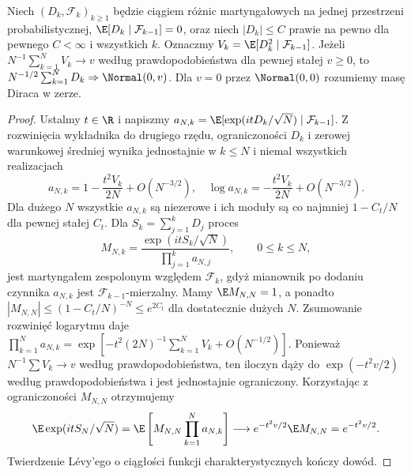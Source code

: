 \begin{lemat}
\label{lem:bounded-martingale-clt}
Niech $(D_k,\mathcal F_k)_{k\ge1}$ będzie ciągiem różnic
martyngałowych na jednej przestrzeni probabilistycznej,
$\E[D_k\mid\mathcal F_{k-1}]=0$, oraz niech
$|D_k|\le C$ prawie na pewno dla pewnego $C<\infty$
i wszystkich $k$. Oznaczmy
$V_k=\E[D_k^2\mid\mathcal F_{k-1}]$.
Jeżeli $N^{-1}\sum_{k=1}^NV_k\to v$ według
prawdopodobieństwa dla pewnej stałej $v\ge0$, to
$N^{-1/2}\sum_{k=1}^ND_k\Rightarrow\Normal(0,v)$.
Dla $v=0$ przez $\Normal(0,0)$ rozumiemy masę Diraca w zerze.
\end{lemat}
\begin{proof}
Ustalmy $t\in\R$ i napiszmy
$a_{N,k}=\E[\exp(itD_k/\sqrt N)\mid\mathcal F_{k-1}]$.
Z rozwinięcia wykładnika do drugiego rzędu, ograniczoności
$D_k$ i zerowej warunkowej średniej wynika jednostajnie
w $k\le N$ i niemal wszystkich realizacjach
\[
 a_{N,k}=1-\frac{t^2V_k}{2N}+O(N^{-3/2}),
 \quad
 \log a_{N,k}=-\frac{t^2V_k}{2N}+O(N^{-3/2}).
\]
Dla dużego $N$ wszystkie $a_{N,k}$ są niezerowe i ich
moduły są co najmniej $1-C_t/N$ dla pewnej stałej $C_t$.
Dla $S_k=\sum_{j=1}^kD_j$ proces
\[
 M_{N,k}=\frac{\exp(itS_k/\sqrt N)}
 {\prod_{j=1}^k a_{N,j}},\qquad 0\le k\le N,
\]
jest martyngałem zespolonym względem $\mathcal F_k$,
gdyż mianownik po dodaniu czynnika $a_{N,k}$ jest
$\mathcal F_{k-1}$-mierzalny. Mamy $\E M_{N,N}=1$,
a ponadto $|M_{N,N}|\le(1-C_t/N)^{-N}\le e^{2C_t}$
dla dostatecznie dużych $N$.
Zsumowanie rozwinięć logarytmu daje
$\prod_{k=1}^N a_{N,k}=
\exp[-t^2(2N)^{-1}\sum_{k=1}^NV_k+O(N^{-1/2})]$.
Ponieważ $N^{-1}\sum V_k\to v$ według prawdopodobieństwa,
ten iloczyn dąży do $\exp(-t^2v/2)$ według
prawdopodobieństwa i jest jednostajnie ograniczony.
Korzystając z ograniczoności $M_{N,N}$ otrzymujemy
\[
 \E\exp(itS_N/\sqrt N)
 =\E\left[M_{N,N}\prod_{k=1}^Na_{N,k}\right]
 \longrightarrow e^{-t^2v/2}\E M_{N,N}
 =e^{-t^2v/2}.
\]
Twierdzenie Lévy'ego o ciągłości funkcji charakterystycznych
kończy dowód.
\end{proof}

